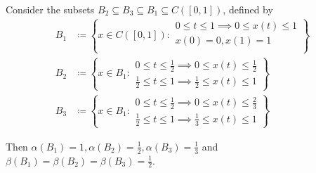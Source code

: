 \begin{example}\label{ex:noncompactness_measures}\cite[exercise 7.3]{Deimling1985}
  Consider the subsets \( B_2 \subseteq B_3 \subseteq B_1 \subseteq C([0, 1]) \), defined by
  \begin{align*}
    B_1 &\coloneqq \left\{
      x \in C([0, 1]) \colon \begin{aligned}
        0 \leq t \leq 1 \implies 0 \leq x(t) \leq 1 \\
        x(0) = 0, x(1) = 1 \\
      \end{aligned}
    \right\}
    \\
    B_2 &\coloneqq \left\{
      x \in B_1 \colon \begin{aligned}
        0 \leq t \leq \frac 1 2 \implies 0 \leq x(t) \leq \frac 1 2 \\
        \frac 1 2 \leq t \leq 1 \implies \frac 1 2 \leq x(t) \leq 1
      \end{aligned}
    \right\}
    \\
    B_3 &\coloneqq \left\{
      x \in B_1 \colon \begin{aligned}
        0 \leq t \leq \frac 1 2 \implies 0 \leq x(t) \leq \frac 2 3 \\
        \frac 1 2 \leq t \leq 1 \implies \frac 1 3 \leq x(t) \leq 1
      \end{aligned}
    \right\}
  \end{align*}

  Then \( \alpha(B_1) = 1, \alpha(B_2) = \frac 1 2, \alpha(B_3) = \frac 1 3 \) and \( \beta(B_1) = \beta(B_2) = \beta(B_3) = \frac 1 2 \).
\end{example}
